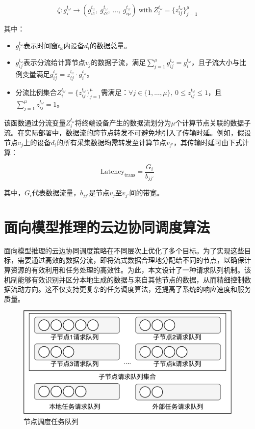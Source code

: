 $$
\zeta: g_i^{t_\omega} \to \left( g_{i1}^{t_\omega},\ g_{i2}^{t_\omega},\ \dots,\ g_{i\mu}^{t_\omega} \right) \ \text{with} \ Z_i^{t_\omega} = \{z_{ij}^{t_\omega}\}_{j=1}^\mu
$$

其中：
\begin{itemize}
    \item $g_i^{t_\omega}$表示时间窗$t_\omega$内设备$d_i$的数据总量。
    \item $g_{ij}^{t_\omega}$表示分流给计算节点$v_j$的数据子流，满足$\sum\limits_{j=1}^\mu g_{ij}^{t_\omega} = g_i^{t_\omega}$，且子流大小与比例变量满足$g_{ij}^{t_\omega} = z_{ij}^{t_\omega} \cdot g_i^{t_\omega}$。
    \item 分流比例集合$Z_i^{t_\omega} = \{z_{ij}^{t_\omega}\}_{j=1}^\mu$需满足：$\forall j \in \{1,\dots,\mu\},\ 0 \leq z_{ij}^{t_\omega} \leq 1$，且$\sum\limits_{j=1}^\mu z_{ij}^{t_\omega} = 1$。
\end{itemize}

该函数通过分流变量$Z_i^{t_\omega}$将终端设备产生的数据流划分为$\mu$个计算节点关联的数据子流。在实际部署中，数据流的跨节点转发不可避免地引入了传输时延。例如，假设节点$v_j$上的设备$d_i$的所有采集数据均需转发至计算节点$v_{j'}$，其传输时延可由下式计算：

\begin{equation}
\text{Latency}_\text{trans}=\frac{G_i}{b_{jj'}}
\end{equation}

其中，\(G_i\)代表数据流量，$b_{jj'}$是节点$v_j$至$v_{j'}$间的带宽。

\section{面向模型推理的云边协同调度算法}

面向模型推理的云边协同调度策略在不同层次上优化了多个目标。为了实现这些目标，需要通过高效的数据分流，即将流式数据合理地分配给不同的节点，以确保计算资源的有效利用和任务处理的高效性。为此，本文设计了一种请求队列机制。该机制能够有效识别并区分本地生成的数据与来自其他节点的数据，从而精细控制数据流动方向。这不仅支持更复杂的任务调度算法，还提高了系统的响应速度和服务质量。

\begin{figure}[h]
  \centering
  \includegraphics[width=0.75\linewidth]{pics/3-11集群调度.png}
  \caption{节点调度任务队列}
  \label{fig:3-11cluster}
\end{figure}

